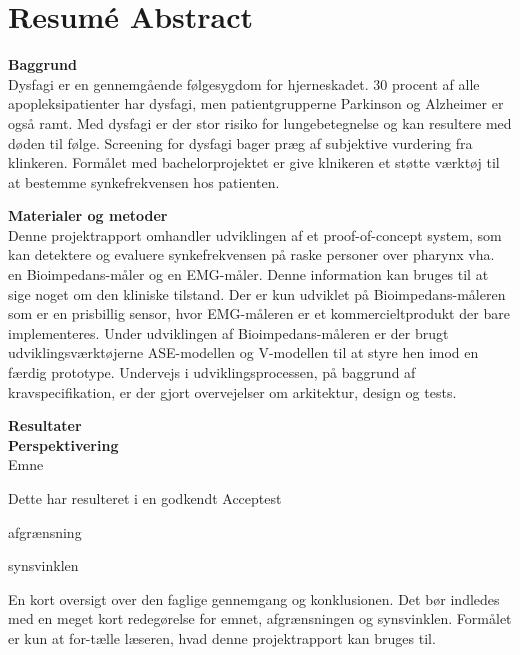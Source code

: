 \chapter{Resumé Abstract}

\textbf{Baggrund}\\
Dysfagi er en gennemgående følgesygdom for hjerneskadet. 30 procent af alle apopleksipatienter har dysfagi, men  patientgrupperne Parkinson og Alzheimer er også ramt. Med dysfagi er der stor risiko for lungebetegnelse og kan resultere med døden til følge. Screening for dysfagi bager præg af subjektive vurdering fra klinkeren. Formålet med bachelorprojektet er give klnikeren et støtte værktøj til at bestemme synkefrekvensen hos patienten.

\textbf{Materialer og metoder}\\
Denne projektrapport omhandler udviklingen af et proof-of-concept system, som kan detektere og evaluere synkefrekvensen på raske personer over pharynx vha. en Bioimpedans-måler og en EMG-måler. Denne information kan bruges til at sige noget om den kliniske tilstand. Der er kun udviklet på Bioimpedans-måleren som er en prisbillig sensor, hvor EMG-måleren er et kommercieltprodukt der bare implementeres. Under udviklingen af Bioimpedans-måleren er der brugt udviklingsværktøjerne ASE-modellen og V-modellen til at styre hen imod en færdig prototype. Undervejs i udviklingsprocessen, på baggrund af kravspecifikation, er der gjort overvejelser om arkitektur, design og tests. 


\textbf{Resultater}\\



\textbf{Perspektivering}\\

Emne





 Dette har resulteret i en godkendt Acceptest



afgrænsning


synsvinklen



En kort oversigt over den faglige gennemgang og konklusionen. Det bør indledes med en meget kort redegørelse for emnet, afgrænsningen og synsvinklen. Formålet er kun at for-tælle læseren, hvad denne projektrapport kan bruges til.